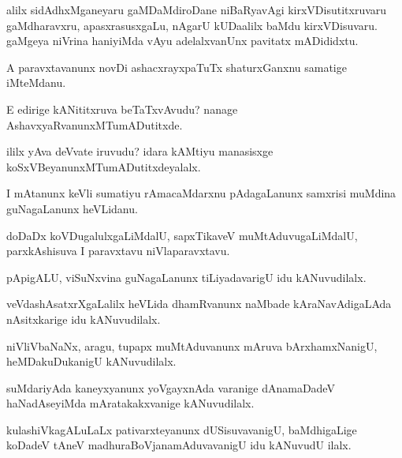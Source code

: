 \documentclass{article}
\begin{document}
\begin{mn}%
alilx sidAdhxMganeyaru gaMDaMdiroDane niBaRyavAgi kirxVDisutitxruvaru gaMdharavxru, 
apasxrasusxgaLu, nAgarU kUDaalilx baMdu kirxVDisuvaru. gaMgeya niVrina haniyiMda vAyu 
adelalxvanUnx pavitatx mADididxtu.
\end{mn}

\begin{mn}%
A paravxtavanunx novDi ashacxrayxpaTuTx shaturxGanxnu samatige iMteMdanu.
\end{mn}

\begin{mn}%
E edirige kANititxruva beTaTxvAvudu? nanage AshavxyaRvanunxMTumADutitxde.
\end{mn}

\begin{mn}%
ililx yAva deVvate iruvudu? idara kAMtiyu manasisxge koSxVBeyanunxMTumADutitxdeyalalx.
\end{mn}

\begin{mn}%
I mAtanunx keVli sumatiyu rAmacaMdarxnu pAdagaLanunx samxrisi muMdina guNagaLanunx heVLidanu.
\end{mn}

\begin{mn}%
doDaDx koVDugalulxgaLiMdalU, sapxTikaveV muMtAduvugaLiMdalU, parxkAshisuva I paravxtavu 
niVlaparavxtavu.
\end{mn}

\begin{mn}%
pApigALU, viSuNxvina guNagaLanunx tiLiyadavarigU idu kANuvudilalx.
\end{mn}

\begin{mn}%
veVdashAsatxrXgaLalilx heVLida dhamRvanunx naMbade kAraNavAdigaLAda nAsitxkarige idu 
kANuvudilalx.
\end{mn}

\begin{mn}%
niVliVbaNaNx, aragu, tupapx muMtAduvanunx mAruva bArxhamxNanigU, heMDakuDukanigU 
kANuvudilalx.
\end{mn}

\begin{mn}%
suMdariyAda kaneyxyanunx yoVgayxnAda varanige dAnamaDadeV haNadAseyiMda mAratakakxvanige 
kANuvudilalx.
\end{mn}

\begin{mn}%
kulashiVkagALuLaLx pativarxteyanunx dUSisuvavanigU, baMdhigaLige koDadeV tAneV 
madhuraBoVjanamAduvavanigU idu kANuvudU ilalx.
\end{mn}
\end{document}
